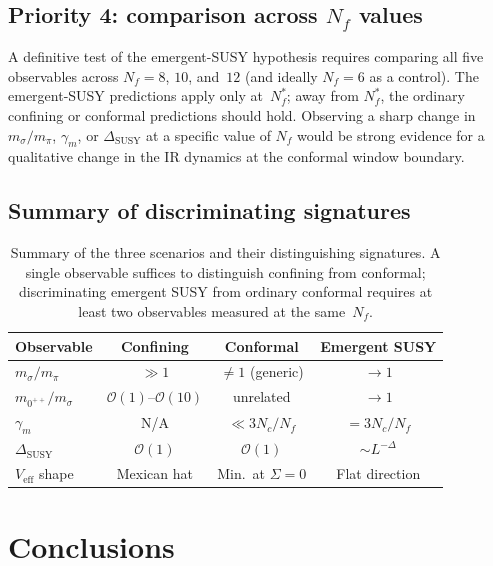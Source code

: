 \documentclass[11pt,a4paper]{article}
\theoremstyle{plain}
\theoremstyle{definition}
\theoremstyle{remark}
\newcommand{\Nc}{N_{\!c}}
\newcommand{\Nf}{N_{\!f}}
\newcommand{\Nfstar}{\Nf^*}
\begin{document}
\subsection{Priority 4: comparison across $\Nf$ values}

A definitive test of the emergent-SUSY hypothesis requires comparing
all five observables across $\Nf = 8$, $10$, and~$12$ (and ideally
$\Nf = 6$ as a control).  The emergent-SUSY predictions apply only
at~$\Nfstar$; away from $\Nfstar$, the ordinary confining or
conformal predictions should hold.  Observing a sharp change in
$m_\sigma / m_\pi$, $\gamma_m$, or $\Delta_{\mathrm{SUSY}}$ at a
specific value of $\Nf$ would be strong evidence for a qualitative
change in the IR dynamics at the conformal window boundary.

\subsection{Summary of discriminating signatures}

\begin{table}[ht]
\centering
\renewcommand{\arraystretch}{1.3}
\caption{Summary of the three scenarios and their distinguishing
  signatures.  A single observable suffices to distinguish confining
  from conformal; discriminating emergent SUSY from ordinary conformal
  requires at least two observables measured at the same~$\Nf$.}
\label{tab:summary-signatures}
\begin{tabular}{@{} l c c c @{}}
\toprule
\textbf{Observable} & \textbf{Confining} &
  \textbf{Conformal} & \textbf{Emergent SUSY} \\
\midrule
$m_\sigma / m_\pi$ & $\gg 1$ & $\neq 1$ (generic) & $\to 1$ \\
$m_{0^{++}} / m_\sigma$ & $\mathcal{O}(1)$--$\mathcal{O}(10)$
  & unrelated & $\to 1$ \\
$\gamma_m$ & N/A & $\ll 3\Nc/\Nf$ & $= 3\Nc/\Nf$ \\
$\Delta_{\mathrm{SUSY}}$ & $\mathcal{O}(1)$ & $\mathcal{O}(1)$
  & $\sim L^{-\Delta}$ \\
$V_{\mathrm{eff}}$ shape & Mexican hat & Min.\ at $\Sigma = 0$ &
  Flat direction \\
\bottomrule
\end{tabular}
\end{table}


\section{Conclusions}
\label{sec:conclusions}
\end{document}
